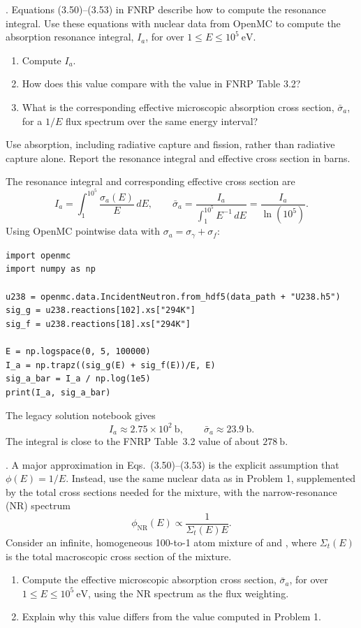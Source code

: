 
. Equations (3.50)--(3.53) in FNRP describe how to
compute the resonance integral. Use these equations with nuclear data from
OpenMC to compute the absorption resonance integral, $I_a$, for
 over $1\le E\le10^5~\mathrm{eV}$.
\begin{enumerate}[label=(\alph*)]
\item Compute $I_a$.
\item How does this value compare with the value in FNRP Table 3.2?
\item What is the corresponding effective microscopic absorption cross
      section, $\bar{\sigma}_a$, for a $1/E$ flux spectrum over the same
      energy interval?
\end{enumerate}
Use absorption, including radiative capture and fission, rather than
radiative capture alone. Report the resonance integral and effective cross
section in barns.

\begin{adaptedsolution}
The resonance integral and corresponding effective cross section are
\[
 I_a=\int_1^{10^5}\frac{\sigma_a(E)}{E}\,dE,
 \qquad
 \bar{\sigma}_a=\frac{I_a}{\int_1^{10^5}E^{-1}\,dE}
 =\frac{I_a}{\ln(10^5)}.
\]
Using OpenMC pointwise data with
$\sigma_a=\sigma_\gamma+\sigma_f$:
\begin{verbatim}
import openmc
import numpy as np

u238 = openmc.data.IncidentNeutron.from_hdf5(data_path + "U238.h5")
sig_g = u238.reactions[102].xs["294K"]
sig_f = u238.reactions[18].xs["294K"]

E = np.logspace(0, 5, 100000)
I_a = np.trapz((sig_g(E) + sig_f(E))/E, E)
sig_a_bar = I_a / np.log(1e5)
print(I_a, sig_a_bar)
\end{verbatim}
The legacy solution notebook gives
\[
 \boxed{I_a\approx2.75\times10^2~\mathrm b},
 \qquad
 \boxed{\bar{\sigma}_a\approx23.9~\mathrm b}.
\]
The integral is close to the FNRP Table~3.2 value of about
$278~\mathrm b$.
\end{adaptedsolution}

\newpage

. A major approximation in Eqs.~(3.50)--(3.53) is the
explicit assumption that $\phi(E)=1/E$. Instead, use the same nuclear data as
in Problem 1, supplemented by the total cross sections needed for the mixture,
with the narrow-resonance (NR) spectrum
\[
 \phi_{\mathrm{NR}}(E)\propto\frac{1}{\Sigma_t(E)E}.
\]
Consider an infinite, homogeneous 100-to-1 atom mixture of  and
, where $\Sigma_t(E)$ is the total macroscopic cross section of
the mixture.
\begin{enumerate}[label=(\alph*)]
\item Compute the effective microscopic absorption cross section,
      $\bar{\sigma}_a$, for  over $1\le E\le10^5~\mathrm{eV}$,
      using the NR spectrum as the flux weighting.
\item Explain why this value differs from the value computed in Problem 1.
\end{enumerate}

